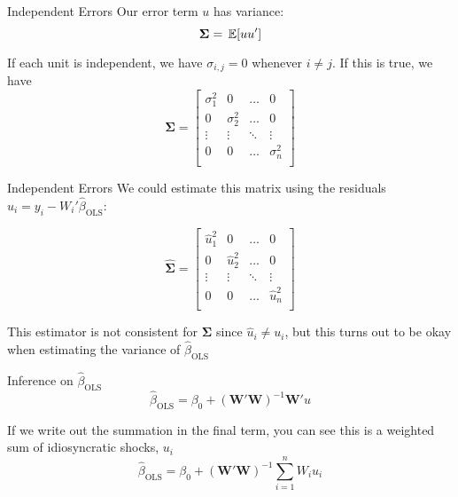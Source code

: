 \documentclass[aspectratio=169,t,11pt,table]{beamer}
\begin{document}
\begin{frame}{Independent Errors}
  Our error term $u$ has variance:
  $$\bm{\Sigma} = \expec{u u'}$$ 
  
  \bigskip
  If each unit is independent, we have $\sigma_{i,j} = 0$ whenever $i \neq j$. If this is true, we have
  $$
    \bm{\Sigma} = \begin{bmatrix}
      \sigma_1^2 & 0 & \dots & 0 \\
      0 & \sigma_2^2 & \dots & 0 \\
      \vdots & \vdots & \ddots & \vdots \\
      0 & 0 & \dots & \sigma_n^2 \\
    \end{bmatrix}
  $$
\end{frame}

\begin{frame}{Independent Errors}
  We could estimate this matrix using the \alert{residuals} $\hat{u}_i = y_i - W_i' \hat{\beta}_{\text{OLS}}$:

  $$
    \hat{\bm{\Sigma}} = \begin{bmatrix}
      \hat{u}_1^2 & 0 & \dots & 0 \\
      0 & \hat{u}_2^2 & \dots & 0 \\
      \vdots & \vdots & \ddots & \vdots \\
      0 & 0 & \dots & \hat{u}_n^2 \\
    \end{bmatrix}
  $$

  \bigskip
  This estimator is not consistent for $\bm{\Sigma}$ since $\hat{u}_i \neq u_i$, but this turns out to be okay when estimating the variance of $\hat{\beta}_{\text{OLS}}$
\end{frame}

\begin{frame}{Inference on $\hat{\beta}_{\text{OLS}}$}
  \vspace*{-\bigskipamount}
  $$
    \hat{\beta}_{\text{OLS}} = \beta_0 + \left(\bm{W}' \bm{W} \right)^{-1} \bm{W}' u 
  $$

  \bigskip
  If we write out the summation in the final term, you can see this is a weighted sum of idiosyncratic shocks, $u_i$
  $$
    \hat{\beta}_{\text{OLS}} = \beta_0 + \left( \bm{W}' \bm{W} \right)^{-1} \sum_{i=1}^n W_i u_i 
  $$
\end{frame}
\end{document}
